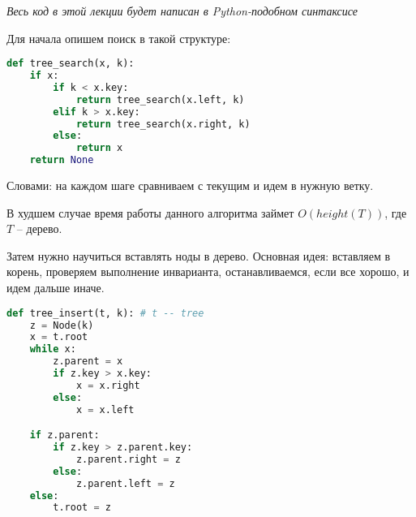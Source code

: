 \documentclass[../main.tex]{subfiles}
\begin{document}
		
		
		
		
		
		

	\textit{Весь код в этой лекции будет написан в Python-подобном синтаксисе}	
	
	Для начала опишем поиск в такой структуре:
	\begin{lstlisting}[language=python]
def tree_search(x, k):
    if x:
        if k < x.key:
            return tree_search(x.left, k)
        elif k > x.key:
            return tree_search(x.right, k)
        else:
            return x
    return None
	\end{lstlisting}
	
	Словами: на каждом шаге сравниваем с текущим и идем в нужную ветку.
	
	\begin{time}
		В худшем случае время работы данного алгоритма займет $O(height(T))$, где $T$ -- дерево.
	\end{time}
	
	Затем нужно научиться вставлять ноды в дерево. Основная идея: вставляем в корень, проверяем выполнение инварианта, останавливаемся, если все хорошо, и идем дальше иначе. 
	
	\begin{lstlisting}[language=python]
def tree_insert(t, k): # t -- tree
    z = Node(k)
    x = t.root
    while x:
	    z.parent = x
        if z.key > x.key:
            x = x.right
        else:
            x = x.left

    if z.parent:
        if z.key > z.parent.key:
            z.parent.right = z
        else:
            z.parent.left = z
    else:
        t.root = z
	\end{lstlisting}
	
	
	
	
	
	
	
	
	
	
	
	
	
	
	
	
	
	
	
	
\end{document}
